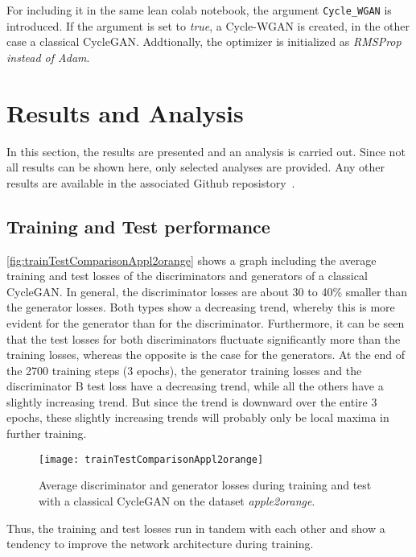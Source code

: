 \documentclass[fleqn,10pt]{SelfArx} %
\begin{document}
For including it in the same lean colab notebook, the argument \texttt{Cycle\_WGAN} is introduced. If the argument is set to \textit{true}, a Cycle-\ac{WGAN} is created, in the other case a classical Cycle\ac{GAN}. Addtionally, the optimizer is initialized  as \textit{\ac{RMSProp} instead of \textit{Adam}}.


\section{Results and Analysis}
In this section, the results are presented and an analysis is carried out. Since not all results can be shown here, only selected analyses are provided. Any other results are available in the associated Github reposistory~\cite{ourGithubRepo}.

\subsection{Training and Test performance}
\autoref{fig:trainTestComparisonAppl2orange} shows a graph including the average training and test losses of the discriminators and  generators of a classical Cycle\ac{GAN}. In general, the discriminator losses are about 30 to 40\% smaller than the generator losses. Both types show a decreasing trend, whereby this is more evident for the generator than for the discriminator. Furthermore, it can be seen that the test losses for both discriminators fluctuate significantly more than the training losses, whereas the opposite is the case for the generators. At the end of the 2700 training steps (3 epochs), the generator training losses and the discriminator B test loss have a decreasing trend, while all the others have a slightly increasing trend. But since the trend is downward over the entire 3 epochs, these slightly increasing trends will probably only be local maxima in further training.

\begin{figure}[htb] 
	\centering 
	\texttt{[image: trainTestComparisonAppl2orange]}
	\caption{Average discriminator and generator losses during training and test with a classical Cycle\ac{GAN} on the dataset \textit{apple2orange}.}
	\label{fig:trainTestComparisonAppl2orange}
\end{figure}

Thus, the training and test losses run in tandem with each other and show a tendency to improve the network architecture during training.
\end{document}
